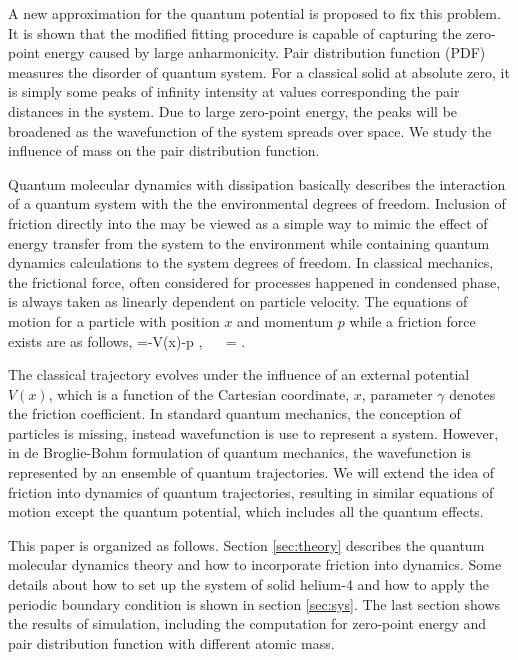 \documentclass[11pt,letter,nocenter]{revtex4-1}
\begin{document}
A new approximation for the quantum potential  is proposed to fix this problem. It is shown that the modified fitting procedure is capable of capturing the zero-point energy caused by large anharmonicity. 
Pair distribution function (PDF) measures the disorder of quantum system. For a classical solid at absolute zero, it is simply some peaks of infinity intensity at values corresponding the pair distances in the system. Due to large zero-point energy, the peaks will be broadened as the wavefunction of the system spreads over space. We study the influence of mass on the pair distribution function.  

Quantum molecular dynamics with dissipation basically describes the interaction of a quantum system with the the environmental degrees of freedom. 
Inclusion of friction directly into the \se may be viewed as a simple way to mimic the effect of energy transfer from the system to the environment while containing quantum dynamics calculations to the system degrees of freedom. In classical mechanics, the frictional force, often considered for processes  happened in condensed phase, is always taken as linearly dependent on particle velocity. The equations of motion for a particle with  position $x$ and momentum $p$ while a friction force exists are as follows, 
\be {} =-\grad V(x)-\gamma p , ~~  = . \ee
 
The classical trajectory evolves under the influence of an external potential $V( x)$, which is a function of the Cartesian coordinate, $x$, parameter $\gamma$ denotes the friction coefficient. In standard quantum mechanics, the conception of particles is missing, instead wavefunction is use to represent a system. 
However, in de Broglie-Bohm formulation of quantum mechanics, the wavefunction is represented by an ensemble of quantum trajectories. We will extend the idea of friction into dynamics of quantum trajectories, resulting in similar equations of motion except the quantum potential, which includes all the quantum effects. 

This paper is organized as follows. Section \ref{sec:theory} describes the quantum molecular dynamics theory and how to incorporate friction into dynamics. Some details about how to set up the system of solid helium-4 and how to apply the periodic boundary condition is shown in section \ref{sec:sys}. The last section shows the results of simulation, including the computation for zero-point energy and pair distribution function with different atomic mass. 
\end{document}
